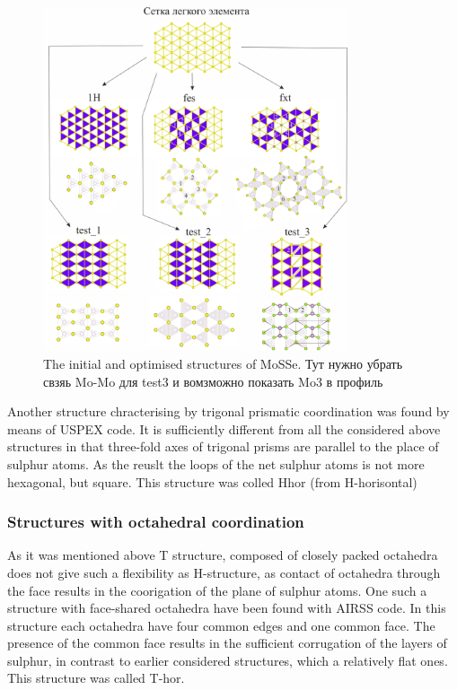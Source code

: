 \documentclass[a4paperm]{article}
\begin{document}
\begin{figure}[H] \centering
        \includegraphics[width=0.8\textwidth]{H-based.jpg}
        \caption{The initial and optimised structures of MoSSe. Тут нужно убрать свзяь Mo-Mo для test3 и вомзможно показать Mo3 в профиль}
\label{H-based}
\end{figure}


Another structure chracterising by trigonal prismatic coordination was found by means of USPEX code.
It is sufficiently different from all the considered above structures in that three-fold axes of trigonal prisms are parallel to the place of sulphur atoms.
As the reuslt the loops of the net sulphur atoms is not more hexagonal, but square. 
This structure was colled Hhor (from H-horisontal)

\subsubsection{Structures with octahedral coordination}

As it was mentioned above T structure, composed of closely packed octahedra does not give such a flexibility as H-structure, as contact of octahedra through the face results in the coorigation of the plane of sulphur atoms. 
One such a structure with face-shared octahedra have been found with AIRSS code.
In this structure each octahedra have four common edges and one common face.
The presence of the common face results in the sufficient corrugation of the layers of sulphur, in contrast to earlier considered structures, which a relatively flat ones.
This structure was called T-hor.
\end{document}
